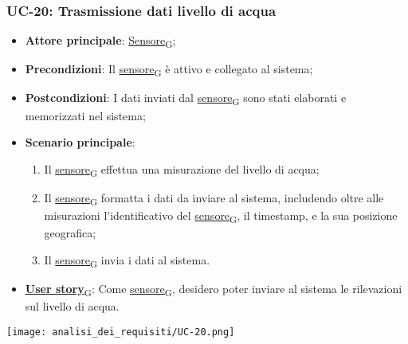 \subsubsection{UC-20: Trasmissione dati livello di acqua}
\begin{itemize}
	\item \textbf{Attore principale}: \href{https://7last.github.io/docs/rtb/documentazione-interna/glossario\#sensore}{Sensore\textsubscript{G}};
	\item \textbf{Precondizioni}: Il \href{https://7last.github.io/docs/rtb/documentazione-interna/glossario\#sensore}{sensore\textsubscript{G}} è attivo e collegato al sistema;
	\item \textbf{Postcondizioni}: I dati inviati dal \href{https://7last.github.io/docs/rtb/documentazione-interna/glossario\#sensore}{sensore\textsubscript{G}} sono stati elaborati e memorizzati nel sistema;
	\item \textbf{Scenario principale}:
	      \begin{enumerate}
		      \item Il \href{https://7last.github.io/docs/rtb/documentazione-interna/glossario\#sensore}{sensore\textsubscript{G}} effettua una misurazione del livello di acqua;
		      \item Il \href{https://7last.github.io/docs/rtb/documentazione-interna/glossario\#sensore}{sensore\textsubscript{G}} formatta i dati da inviare al sistema, includendo oltre alle misurazioni l'identificativo del \href{https://7last.github.io/docs/rtb/documentazione-interna/glossario\#sensore}{sensore\textsubscript{G}},
		            il timestamp, e la sua posizione geografica;
		      \item Il \href{https://7last.github.io/docs/rtb/documentazione-interna/glossario\#sensore}{sensore\textsubscript{G}} invia i dati al sistema.
	      \end{enumerate}
	\item \href{https://7last.github.io/docs/rtb/documentazione-interna/glossario\#user-story}{\textbf{User story}\textsubscript{G}}: Come \href{https://7last.github.io/docs/rtb/documentazione-interna/glossario\#sensore}{sensore\textsubscript{G}}, desidero poter inviare al sistema le rilevazioni sul livello di acqua.
\end{itemize}

\begin{center}
	\texttt{[image: analisi\_dei\_requisiti/UC-20.png]}
\end{center}
